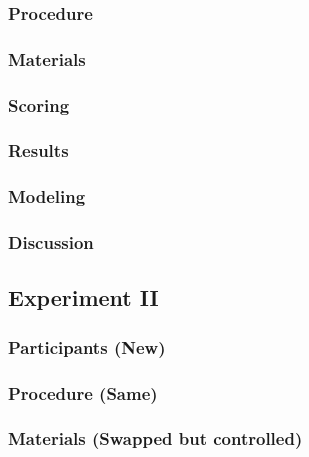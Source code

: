 \documentclass[]{book}
\theoremstyle{definition}
\theoremstyle{definition}
\theoremstyle{definition}
\theoremstyle{remark}
\begin{document}
\hypertarget{procedure-1}{%
\subsubsection{Procedure}\label{procedure-1}}

\hypertarget{materials-1}{%
\subsubsection{Materials}\label{materials-1}}

\hypertarget{scoring}{%
\subsubsection{Scoring}\label{scoring}}

\hypertarget{results-1}{%
\subsubsection{Results}\label{results-1}}

\hypertarget{modeling-1}{%
\subsubsection{Modeling}\label{modeling-1}}

\hypertarget{discussion-1}{%
\subsubsection{Discussion}\label{discussion-1}}

\hypertarget{experiment-ii}{%
\subsection{Experiment II}\label{experiment-ii}}

\hypertarget{participants-new}{%
\subsubsection{Participants (New)}\label{participants-new}}

\hypertarget{procedure-same}{%
\subsubsection{Procedure (Same)}\label{procedure-same}}

\hypertarget{materials-swapped-but-controlled}{%
\subsubsection{Materials (Swapped but
controlled)}\label{materials-swapped-but-controlled}}
\end{document}
